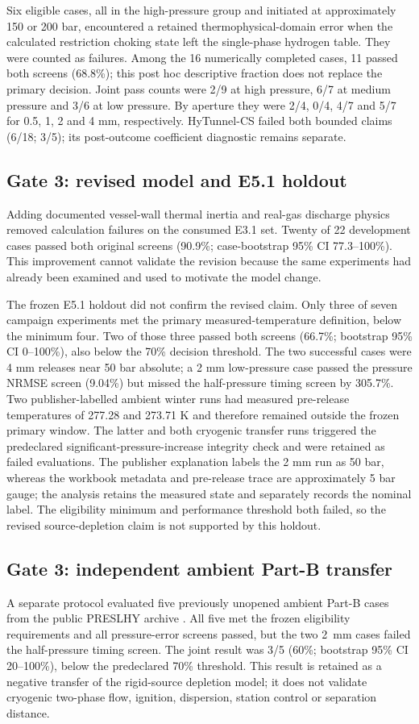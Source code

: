 \documentclass[12pt,a4paper]{article}
\begin{document}
Six eligible cases, all in the high-pressure group and initiated at approximately
150 or 200 bar, encountered a retained thermophysical-domain error when the
calculated restriction choking state left the single-phase hydrogen table. They
were counted as failures. Among the 16 numerically completed cases, 11 passed both
screens (68.8\%); this post hoc descriptive fraction does not replace the primary
decision. Joint pass counts were 2/9 at high pressure, 6/7 at medium pressure and
3/6 at low pressure. By aperture they were 2/4, 0/4, 4/7 and 5/7 for 0.5, 1, 2
and 4 mm, respectively. HyTunnel-CS failed both bounded claims (6/18; 3/5);
its post-outcome coefficient diagnostic remains separate.

\subsection{Gate 3: revised model and E5.1 holdout}
Adding documented vessel-wall thermal inertia and real-gas discharge physics
removed calculation failures on the consumed E3.1 set. Twenty of 22 development
cases passed both original screens (90.9\%; case-bootstrap 95\% CI 77.3--100\%).
This improvement cannot validate the revision because the same experiments had
already been examined and used to motivate the model change.

The frozen E5.1 holdout did not confirm the revised claim. Only three of seven
campaign experiments met the primary measured-temperature definition, below the
minimum four. Two of those three passed both screens (66.7\%; bootstrap 95\% CI
0--100\%), also below the 70\% decision threshold. The two successful cases were
4 mm releases near 50 bar absolute; a 2 mm low-pressure case passed the pressure
NRMSE screen (9.04\%) but missed the half-pressure timing screen by 305.7\%.
Two publisher-labelled ambient winter runs had measured pre-release temperatures
of 277.28 and 273.71 K and therefore remained outside the frozen primary window.
The latter and both cryogenic transfer runs triggered the predeclared
significant-pressure-increase integrity check and were retained as failed
evaluations. The publisher explanation labels the 2 mm run as 50 bar, whereas
the workbook metadata and pre-release trace are approximately 5 bar gauge; the
analysis retains the measured state and separately records the nominal label.
The eligibility minimum and performance threshold both failed, so the revised
source-depletion claim is not supported by this holdout.

\subsection{Gate 3: independent ambient Part-B transfer}
A separate protocol evaluated five previously unopened ambient Part-B cases
from the public PRESLHY archive \cite{preslhypartb}. All five met the frozen
eligibility requirements and all pressure-error screens passed, but the two
2~mm cases failed the half-pressure timing screen. The joint result was 3/5
(60\%; bootstrap 95\% CI 20--100\%), below the predeclared 70\% threshold.
This result is retained as a negative transfer of the rigid-source depletion
model; it does not validate cryogenic two-phase flow, ignition, dispersion,
station control or separation distance.
\end{document}

